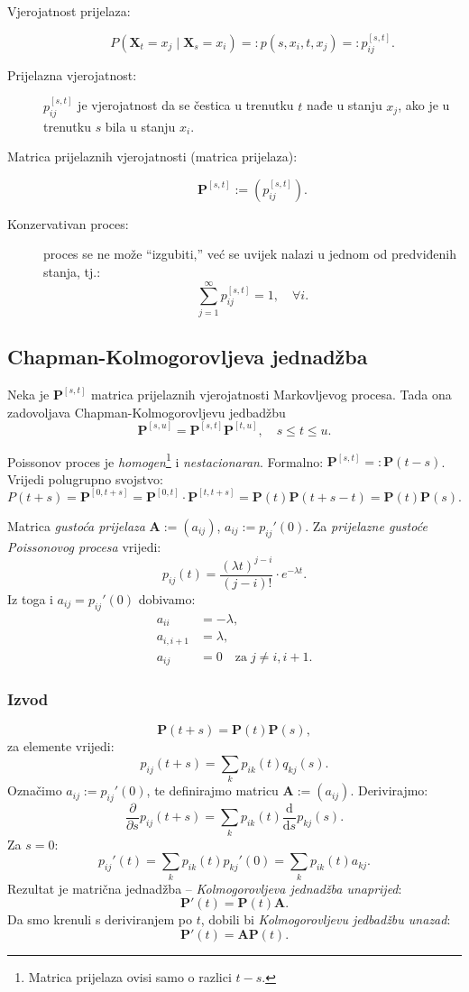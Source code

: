 \documentclass[12pt,english]{article}
\newcommand{\X}{\mathbf X}
\newcommand{\A}{\mathbf A}
\newcommand{\MP}{\mathbf P}
\newcommand{\vertS}{\; \vert \;}
\begin{document}
\begin{description}
  \item[Vjerojatnost prijelaza:]
  $$P(\X_t=x_j \vertS \X_s = x_i)=: p(s,x_i,t,x_j) =: p_{ij}^{[s,t]}.$$
  \item[Prijelazna vjerojatnost:] $p_{ij}^{[s,t]}$ je vjerojatnost da se čestica u trenutku $t$ nađe u stanju $x_j$, ako je u trenutku $s$ bila u stanju $x_i$.
  \item[Matrica prijelaznih vjerojatnosti (matrica prijelaza):]
  $$\MP^{[s,t]} := \left(p_{ij}^{[s,t]}\right).$$
  \item[Konzervativan proces:] proces se ne može ``izgubiti,'' već se uvijek nalazi u jednom od predviđenih stanja, tj.:
  $$\sum\limits_{j=1}^\infty p_{ij}^{[s,t]} = 1, \quad \forall i.$$
\end{description}

\subsection{Chapman-Kolmogorovljeva jednadžba}
Neka je $\MP^{[s,t]}$ matrica prijelaznih vjerojatnosti Markovljevog procesa. Tada ona zadovoljava Chapman-Kolmogorovljevu jedbadžbu
$$\MP^{[s,u]} = \MP^{[s,t]}\MP^{[t,u]},\quad s \leq t \leq u.$$

\noindent Poissonov proces je \emph{homogen}\footnote{Matrica prijelaza ovisi samo o razlici $t-s$.} i \emph{nestacionaran}. Formalno: $\MP^{[s,t]} =: \MP(t-s)$. Vrijedi polugrupno svojstvo:
$$P(t+s) = \MP^{[0,t+s]}=\MP^{[0,t]}\cdot \MP^{[t,t+s]}=\MP(t)\MP(t+s-t)=\MP(t)\MP(s).$$

\noindent Matrica \emph{gustoća prijelaza} $\A := (a_{ij})$, $a_{ij}:=p_{ij}'(0)$. Za \emph{prijelazne gustoće Poissonovog procesa} vrijedi:
$$p_{ij}(t)=\frac{(\lambda t)^{j-i}}{(j-i)!}\cdot e^{-\lambda t}.$$
Iz toga i $a_{ij} = p_{ij}'(0)$ dobivamo:
\begin{align}
a_{ii} &= -\lambda, \nonumber \\
a_{i,i+1} &= \lambda, \nonumber \\
a_{ij} &= 0\quad \text{za}\; j\neq i, i+1. \nonumber
\end{align}


\subsubsection{Izvod}
$$\MP(t+s)=\MP(t)\MP(s),$$
za elemente vrijedi:
$$p_{ij}(t+s) = \sum\limits_k p_{ik}(t)q_{kj}(s).$$
Označimo $a_{ij}:=p_{ij}'(0)$, te definirajmo matricu $\A := (a_{ij})$. Derivirajmo:
$$\frac{\partial}{\partial s}p_{ij}(t+s) = \sum\limits_k p_{ik}(t)\frac{\mathrm d}{\mathrm ds}p_{kj}(s).$$
Za $s=0$:
$$p_{ij}'(t)=\sum\limits_k p_{ik}(t)p_{kj}'(0)=\sum\limits_k p_{ik}(t)a_{kj}.$$
Rezultat je matrična jednadžba -- \emph{Kolmogorovljeva jednadžba unaprijed}:
$$\MP'(t)=\MP(t)\A.$$
Da smo krenuli s deriviranjem po $t$, dobili bi \emph{Kolmogorovljevu jedbadžbu unazad}:
$$\MP'(t)=\A\MP(t).$$
\end{document}
